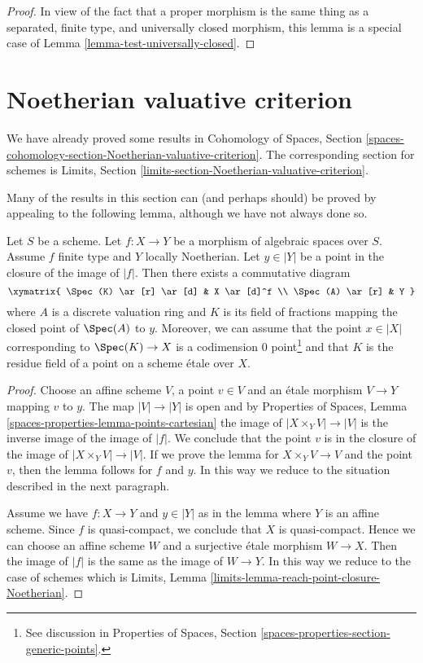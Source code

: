 \begin{proof}
In view of the fact that a proper morphism is the same thing as
a separated, finite type, and universally closed morphism, this
lemma is a special case of Lemma \ref{lemma-test-universally-closed}.
\end{proof}


\section{Noetherian valuative criterion}
\label{section-Noetherian-valuative-criterion}

\noindent
We have already proved some results in Cohomology of Spaces, Section
\ref{spaces-cohomology-section-Noetherian-valuative-criterion}.
The corresponding section for schemes is
Limits, Section \ref{limits-section-Noetherian-valuative-criterion}.

\medskip\noindent
Many of the results in this section can (and perhaps should)
be proved by appealing to the following lemma, although we have not
always done so.

\begin{lemma}
\label{lemma-reach-point-closure-Noetherian}
Let $S$ be a scheme. Let $f : X \to Y$ be a morphism of algebraic spaces
over $S$. Assume $f$ finite type and $Y$ locally Noetherian.
Let $y \in |Y|$ be a point in the closure of the image of $|f|$.
Then there exists a commutative diagram
$$
\xymatrix{
\Spec(K) \ar[r] \ar[d] & X \ar[d]^f \\
\Spec(A) \ar[r] & Y
}
$$
where $A$ is a discrete valuation ring and $K$ is its field of fractions
mapping the closed point of $\Spec(A)$ to $y$. Moreover, we can assume
that the point $x \in |X|$ corresponding to $\Spec(K) \to X$ is a
codimension $0$ point\footnote{See discussion in
Properties of Spaces, Section \ref{spaces-properties-section-generic-points}.}
and that $K$ is the residue field of a point
on a scheme \'etale over $X$.
\end{lemma}

\begin{proof}
Choose an affine scheme $V$, a point $v \in V$ and an \'etale morphism
$V \to Y$ mapping $v$ to $y$. The map $|V| \to |Y|$ is open and by
Properties of Spaces, Lemma \ref{spaces-properties-lemma-points-cartesian}
the image of $|X \times_Y V| \to |V|$ is the inverse image of the
image of $|f|$. We conclude that the point $v$ is in the closure of the
image of $|X \times_Y V| \to |V|$. If we prove the lemma for
$X \times_Y V \to V$ and the point $v$, then the lemma follows for
$f$ and $y$. In this way we reduce to the situation described in the
next paragraph.

\medskip\noindent
Assume we have $f : X \to Y$ and $y \in |Y|$ as in the lemma where
$Y$ is an affine scheme. Since $f$ is quasi-compact, we conclude that
$X$ is quasi-compact. Hence we can choose an affine scheme $W$ and
a surjective \'etale morphism $W \to X$. Then the image of
$|f|$ is the same as the image of $W \to Y$. In this way we reduce
to the case of schemes which is
Limits, Lemma \ref{limits-lemma-reach-point-closure-Noetherian}.
\end{proof}

